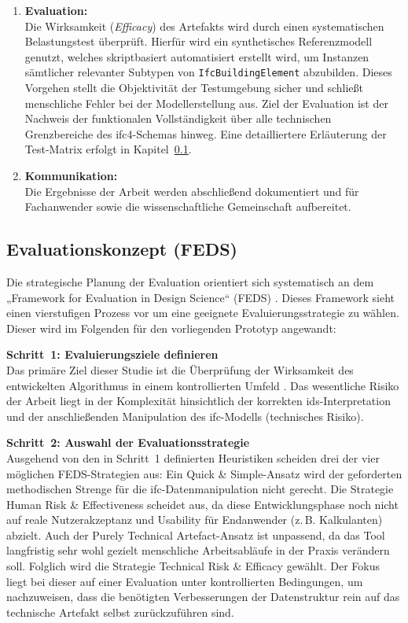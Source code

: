 \begin{enumerate}
    \item \textbf{Evaluation:} \\
    Die Wirksamkeit (\textit{Efficacy}) des Artefakts wird durch einen systematischen 
    Belastungstest überprüft. Hierfür wird ein synthetisches Referenzmodell genutzt, 
    welches skriptbasiert automatisiert erstellt wird, um Instanzen sämtlicher relevanter 
    Subtypen von \texttt{IfcBuildingElement} abzubilden. Dieses Vorgehen stellt die 
    Objektivität der Testumgebung sicher und schließt menschliche Fehler bei der 
    Modellerstellung aus. Ziel der Evaluation ist der Nachweis der funktionalen 
    Vollständigkeit über alle technischen Grenzbereiche des \gls{ifc}4-Schemas hinweg. 
    Eine detailliertere Erläuterung der Test-Matrix erfolgt in Kapitel~\ref{subsec:evaluation}.

    \item \textbf{Kommunikation:} \\
    Die Ergebnisse der Arbeit werden abschließend dokumentiert und für Fachanwender 
    sowie die wissenschaftliche Gemeinschaft aufbereitet.
\end{enumerate}

\subsection{Evaluationskonzept (FEDS)}
\label{subsec:evaluation}

Die strategische Planung der Evaluation orientiert sich systematisch an dem 
„Framework for Evaluation in Design Science“ (FEDS) \cite{venable2016feds}. 
Dieses Framework sieht einen vierstufigen Prozess vor um eine geeignete 
Evaluierungsstrategie zu wählen. Dieser wird im Folgenden für den vorliegenden 
Prototyp angewandt:

\textbf{Schritt~1: Evaluierungsziele definieren} \\
Das primäre Ziel dieser Studie ist die Überprüfung der Wirksamkeit des entwickelten 
Algorithmus in einem kontrollierten Umfeld \cite{venable2016feds}. 
Das wesentliche Risiko der Arbeit liegt in der Komplexität hinsichtlich der korrekten 
\gls{ids}-Interpretation und der anschließenden Manipulation des \gls{ifc}-Modells 
(technisches Risiko). 

\textbf{Schritt~2: Auswahl der Evaluationsstrategie} \\
Ausgehend von den in Schritt~1 definierten Heuristiken scheiden drei der vier 
möglichen FEDS-Strategien aus: Ein \glqq Quick \& Simple\grqq{}-Ansatz wird der 
geforderten methodischen Strenge für die \gls{ifc}-Datenmanipulation nicht gerecht. 
Die Strategie \glqq Human Risk \& Effectiveness\grqq{} scheidet aus, da diese 
Entwicklungsphase noch nicht auf reale Nutzerakzeptanz und Usability für Endanwender 
(z.\,B. Kalkulanten) abzielt. Auch der \glqq Purely Technical Artefact\grqq{}-Ansatz 
ist unpassend, da das Tool langfristig sehr wohl gezielt menschliche Arbeitsabläufe 
in der Praxis verändern soll. 
Folglich wird die Strategie \glqq Technical Risk \& Efficacy\grqq{} gewählt. 
Der Fokus liegt bei dieser auf einer Evaluation unter 
kontrollierten Bedingungen, um nachzuweisen, dass die benötigten Verbesserungen der 
Datenstruktur rein auf das technische Artefakt selbst zurückzuführen sind.

